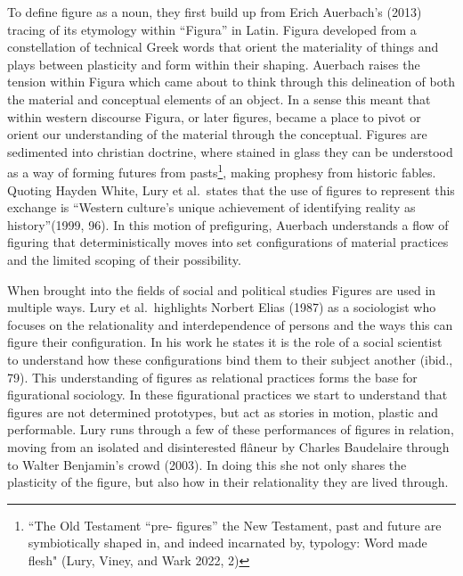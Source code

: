 To define figure as a noun, they first build up from Erich Auerbach's
(2013) tracing of its etymology within ``Figura'' in Latin. Figura
developed from a constellation of technical Greek words that orient the
materiality of things and plays between plasticity and form within their
shaping. Auerbach raises the tension within Figura which came about to
think through this delineation of both the material and conceptual
elements of an object. In a sense this meant that within western
discourse Figura, or later figures, became a place to pivot or orient
our understanding of the material through the conceptual. Figures are
sedimented into christian doctrine, where stained in glass they can be
understood as a way of forming futures from pasts\footnote{``The Old
  Testament ``pre- figures'' the New Testament, past and future are
  symbiotically shaped in, and indeed incarnated by, typology: Word made
  flesh" (Lury, Viney, and Wark 2022, 2)}, making prophesy from historic
fables. Quoting Hayden White, Lury et al.~states that the use of figures
to represent this exchange is ``Western culture's unique achievement of
identifying reality as history''(1999, 96). In this motion of
prefiguring, Auerbach understands a flow of figuring that
deterministically moves into set configurations of material practices
and the limited scoping of their possibility.

When brought into the fields of social and political studies Figures are
used in multiple ways. Lury et al.~highlights Norbert Elias (1987) as a
sociologist who focuses on the relationality and interdependence of
persons and the ways this can figure their configuration. In his work he
states it is the role of a social scientist to understand how these
configurations bind them to their subject another (ibid., 79). This
understanding of figures as relational practices forms the base for
figurational sociology. In these figurational practices we start to
understand that figures are not determined prototypes, but act as
stories in motion, plastic and performable. Lury runs through a few of
these performances of figures in relation, moving from an isolated and
disinterested flâneur by Charles Baudelaire through to Walter Benjamin's
crowd (2003). In doing this she not only shares the plasticity of the
figure, but also how in their relationality they are lived through.

